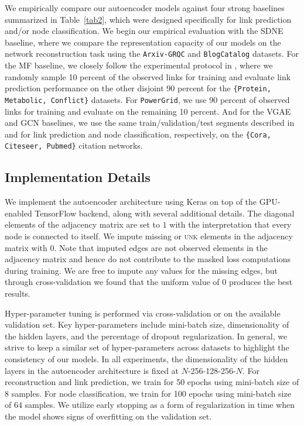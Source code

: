 \documentclass[letterpaper, conference]{IEEEtran}  %
\begin{document}
We empirically compare our autoencoder models against four strong baselines summarized in Table~\ref{tab2}, which were designed specifically for link prediction and/or node classification. We begin our empirical evaluation with the SDNE \cite{Wang:2016} baseline, where we compare the representation capacity of our models on the network reconstruction task using the \texttt{Arxiv-GRQC} and \texttt{BlogCatalog} datasets. For the MF baseline, we closely follow the experimental protocol in \cite{Menon:2011}, where we randomly sample 10 percent of the observed links for training and evaluate link prediction performance on the other disjoint 90 percent for the \texttt{\{Protein, Metabolic, Conflict\}} datasets. For \texttt{PowerGrid}, we use 90 percent of observed links for training and evaluate on the remaining 10 percent. And for the VGAE and GCN baselines, we use the same train/validation/test segments described in \cite{VGAE:2016} and \cite{Kipf:2016} for link prediction and node classification, respectively, on the \texttt{\{Cora, Citeseer, Pubmed\}} citation networks.

\subsection{Implementation Details}
%
We implement the autoencoder architecture using Keras \cite{Keras} on top of the GPU-enabled TensorFlow \cite{TF} backend, along with several additional details. The diagonal elements of the adjacency matrix are set to $1$ with the interpretation that every node is connected to itself. We impute missing or \textsc{unk} elements in the adjacency matrix with $0$. Note that imputed edges are not observed elements in the adjacency matrix and hence do not contribute to the masked loss computations during training. We are free to impute any values for the missing edges, but through cross-validation we found that the uniform value of $0$ produces the best results.

Hyper-parameter tuning is performed via cross-validation or on the available validation set. Key hyper-parameters include mini-batch size, dimensionality of the hidden layers, and the percentage of dropout regularization. In general, we strive to keep a similar set of hyper-parameters across datasets to highlight the consistency of our models. In all experiments, the dimensionality of the hidden layers in the autoencoder architecture is fixed at $N$-256-128-256-$N$. For reconstruction and link prediction, we train for 50 epochs using mini-batch size of 8 samples. For node classification, we train for 100 epochs using mini-batch size of 64 samples. We utilize early stopping as a form of regularization in time when the model shows signs of overfitting on the validation set.
\end{document}

